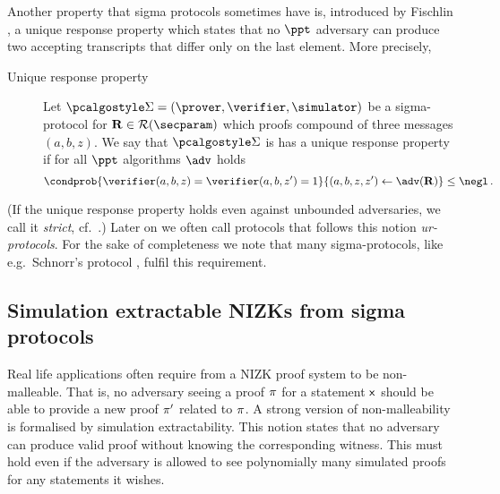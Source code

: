 \let\accentvec\vec \documentclass[runningheads,10pt]{llncs}
\begin{document}
Another property that sigma protocols sometimes have is, introduced by Fischlin \cite{C:Fischlin05}, a unique response property which states that no $\ppt$ adversary  can produce two accepting transcripts that differ only on the last element.
More precisely,
\begin{description}
	\item[Unique response property] Let $\sigmaprot = (\prover, \verifier,
			\simulator)$ be a sigma-protocol for $\REL \in \RELGEN(\secparam)$ which
			proofs compound of three messages $(a, b, z)$. We say that
			$\sigmaprot$ is has a unique response property if for all $\ppt$
			algorithms $\adv$ holds 
			\[
				\condprob{\verifier (a, b, z) = \verifier (a, b, z')  = 1}{(a, b, z,
				z') \gets \adv(\REL)} \leq \negl\,.
			\]
\end{description}
(If the unique response property holds even against unbounded adversaries, we call it \emph{strict}, cf.~\cite{INDOCRYPT:FKMV12}.)
Later on we often call protocols that follows this notion \emph{ur-protocols}.
For the sake of completeness we note that many sigma-protocols, like e.g.~Schnorr's protocol \cite{C:Schnorr89}, fulfil this requirement.


\subsection{Simulation extractable NIZKs from sigma protocols}
Real life applications often require from a NIZK proof system to be
non-malleable. That is, no adversary seeing a proof $\pi$ for a statement
$\mathsf{x}$ should be able to provide a new proof $\pi'$ related to
$\pi$.  A strong version of non-malleability is formalised by simulation
extractability.  This notion states that no adversary can produce valid proof
without knowing the corresponding witness. This must hold even if the
adversary is allowed to see polynomially many simulated proofs for any
statements it wishes.
\end{document}
